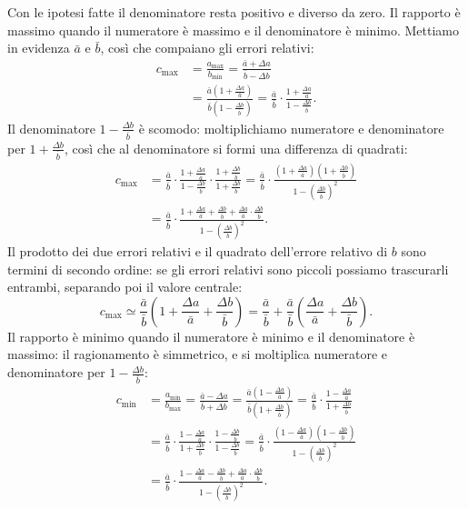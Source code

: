 \documentclass[11pt,a4paper]{article}
\begin{document}
Con le ipotesi fatte il denominatore resta positivo e diverso da zero. Il
rapporto è massimo quando il numeratore è massimo e il denominatore è
minimo. Mettiamo in evidenza $\bar a$ e $\bar b$, così che compaiano gli
errori relativi:
\begin{align*}
c_{\max} &= \frac{a_{\max}}{b_{\min}} = \frac{\bar a + \Delta a}{\bar b - \Delta b}\\
&= \frac{\bar a\left(1 + \frac{\Delta a}{\bar a}\right)}{\bar b\left(1 - \frac{\Delta b}{\bar b}\right)}
= \frac{\bar a}{\bar b}\cdot\frac{1 + \frac{\Delta a}{\bar a}}{1 - \frac{\Delta b}{\bar b}}.
\end{align*}
Il denominatore $1 - \frac{\Delta b}{\bar b}$ è scomodo: moltiplichiamo
numeratore e denominatore per $1 + \frac{\Delta b}{\bar b}$, così che al
denominatore si formi una differenza di quadrati:
\begin{align*}
c_{\max} &= \frac{\bar a}{\bar b}\cdot\frac{1 + \frac{\Delta a}{\bar a}}{1 - \frac{\Delta b}{\bar b}}\cdot\frac{1 + \frac{\Delta b}{\bar b}}{1 + \frac{\Delta b}{\bar b}}
= \frac{\bar a}{\bar b}\cdot\frac{\left(1 + \frac{\Delta a}{\bar a}\right)\left(1 + \frac{\Delta b}{\bar b}\right)}{1 - \left(\frac{\Delta b}{\bar b}\right)^{2}}\\
&= \frac{\bar a}{\bar b}\cdot\frac{1 + \frac{\Delta a}{\bar a} + \frac{\Delta b}{\bar b} + \frac{\Delta a}{\bar a}\cdot\frac{\Delta b}{\bar b}}{1 - \left(\frac{\Delta b}{\bar b}\right)^{2}}.
\end{align*}
Il prodotto dei due errori relativi e il quadrato dell'errore relativo di
$b$ sono termini di secondo ordine: se gli errori relativi sono piccoli
possiamo trascurarli entrambi, separando poi il valore centrale:
\begin{equation*}
c_{\max} \simeq \frac{\bar a}{\bar b}\left(1 + \frac{\Delta a}{\bar a} + \frac{\Delta b}{\bar b}\right)
= \frac{\bar a}{\bar b} + \frac{\bar a}{\bar b}\left(\frac{\Delta a}{\bar a} + \frac{\Delta b}{\bar b}\right).
\end{equation*}
Il rapporto è minimo quando il numeratore è minimo e il denominatore è
massimo: il ragionamento è simmetrico, e si moltiplica numeratore e
denominatore per $1 - \frac{\Delta b}{\bar b}$:
\begin{align*}
c_{\min} &= \frac{a_{\min}}{b_{\max}} = \frac{\bar a - \Delta a}{\bar b + \Delta b}
= \frac{\bar a\left(1 - \frac{\Delta a}{\bar a}\right)}{\bar b\left(1 + \frac{\Delta b}{\bar b}\right)}
= \frac{\bar a}{\bar b}\cdot\frac{1 - \frac{\Delta a}{\bar a}}{1 + \frac{\Delta b}{\bar b}}\\
&= \frac{\bar a}{\bar b}\cdot\frac{1 - \frac{\Delta a}{\bar a}}{1 + \frac{\Delta b}{\bar b}}\cdot\frac{1 - \frac{\Delta b}{\bar b}}{1 - \frac{\Delta b}{\bar b}}
= \frac{\bar a}{\bar b}\cdot\frac{\left(1 - \frac{\Delta a}{\bar a}\right)\left(1 - \frac{\Delta b}{\bar b}\right)}{1 - \left(\frac{\Delta b}{\bar b}\right)^{2}}\\
&= \frac{\bar a}{\bar b}\cdot\frac{1 - \frac{\Delta a}{\bar a} - \frac{\Delta b}{\bar b} + \frac{\Delta a}{\bar a}\cdot\frac{\Delta b}{\bar b}}{1 - \left(\frac{\Delta b}{\bar b}\right)^{2}}.
\end{align*}
\end{document}
